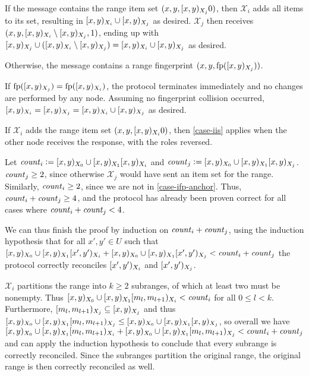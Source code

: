\begin{caselist}
 \label{case-iis}  If the message contains the range item set $({x}, {y}, [{x},{y})_{X_j}{0})$, then $\mathcal{X}_i$ adds all items to its set, resulting in $[{x},{y})_{X_i} \cup [{x},{y})_{X_j}$ as desired. $\mathcal{X}_j$ then receives $({x}, {y}, {[{x},{y})_{X_i} \setminus [{x},{y})_{X_j}}, {1})$, ending up with $[{x},{y})_{X_j} \cup ([{x},{y})_{X_i} \setminus [{x},{y})_{X_j}) = [{x},{y})_{X_i} \cup [{x},{y})_{X_j}$ as desired.

 \label{case-ifp} Otherwise, the message contains a range fingerprint $({x}, {y}, {\operatorname{fp}([{x},{y})_{X_j})})$.

\begin{caselist}
 If $\operatorname{fp}([{x},{y})_{X_j}) = \operatorname{fp}([{x},{y})_{X_i})$, the protocol terminates immediately and no changes are performed by any node. Assuming no fingerprint collision occurred, $[{x},{y})_{X_i} = [{x},{y})_{X_j} = [{x},{y})_{X_i} \cup [{x},{y})_{X_j}$ as desired.

 \label{case-ifp-anchor} If $\mathcal{X}_i$ adds the range item set $({x}, {y}, [{x},{y})_{X_i}{0})$, then \cref{case-iis} applies when the other node receives the response, with the roles reversed.

\case[Recurse] Let $\mathit{count}_{i} \vcentcolon= [{x},{y})_{X_0} \cup [{x},{y})_{X_1}{[{x},{y})_{X_i}}$ and $\mathit{count}_{j} \vcentcolon= [{x},{y})_{X_0} \cup [{x},{y})_{X_1}{[{x},{y})_{X_j}}$. $\mathit{count}_{j} \geq 2$, since otherwise $\mathcal{X}_j$ would have sent an item set for the range. Similarly, $\mathit{count}_{i} \geq 2$, since we are not in \cref{case-ifp-anchor}. Thus, $\mathit{count}_{i} + \mathit{count}_{j} \geq 4$, and the protocol has already been proven correct for all cases where $\mathit{count}_{i} + \mathit{count}_{j} < 4$. 

We can thus finish the proof by induction on $\mathit{count}_{i} + \mathit{count}_{j}$, using the induction hypothesis that for all $x', y' \in U$ such that $[{x},{y})_{X_0} \cup [{x},{y})_{X_1}{[{x'},{y'})_{X_i}} + [{x},{y})_{X_0} \cup [{x},{y})_{X_1}{[{x'},{y'})_{X_j}} < \mathit{count}_{i} + \mathit{count}_{j}$ the protocol correctly reconciles $[{x'},{y'})_{X_i}$ and $[{x'},{y'})_{X_j}$.

$\mathcal{X}_i$ partitions the range into $k \geq 2$ subranges, of which at least two must be nonempty.
Thus $[{x},{y})_{X_0} \cup [{x},{y})_{X_1}{[{m_l},{m_{l + 1}})_{X_i}} < \mathit{count}_{i}$ for all $0 \leq l < k$.
Furthermore, $[{m_l},{m_{l + 1}})_{X_j} \subseteq [{x},{y})_{X_j}$ and thus $[{x},{y})_{X_0} \cup [{x},{y})_{X_1}{[{m_l},{m_{l + 1}})_{X_j}} \leq [{x},{y})_{X_0} \cup [{x},{y})_{X_1}{[{x},{y})_{X_j}}$, so overall we have $[{x},{y})_{X_0} \cup [{x},{y})_{X_1}{[{m_l},{m_{l + 1}})_{X_i}} + [{x},{y})_{X_0} \cup [{x},{y})_{X_1}{[{m_l},{m_{l + 1}})_{X_j}} < \mathit{count}_{i} + \mathit{count}_{j}$ and can apply the induction hypothesis to conclude that every subrange is correctly reconciled. Since the subranges partition the original range, the original range is then correctly reconciled as well.
\end{caselist}
\end{caselist}

